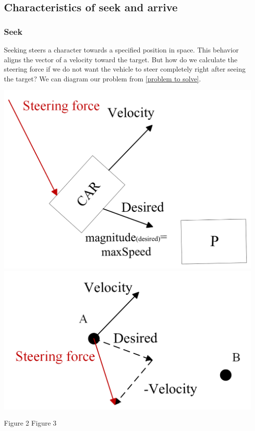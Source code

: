 \documentclass[10pt,twoside,english,a4paper]{article}
\begin{document}
\subsection{Characteristics of seek and arrive } \label{characterictics of seek and arrive}

\subsubsection{Seek} \label{seek}

Seeking steers a character towards a specified position in space. 
This behavior aligns the vector of a velocity toward the target. 
But how do we calculate the steering force if we do not want the 
vehicle to steer completely right after seeing the target? We can 
diagram our problem from \ref{problem to solve}.

\includegraphics[scale=0.22]{diagram_car.png} 	
\includegraphics[scale=0.22]{diagram_steeringForce.png}\par
\quad Figure 2 
\hspace*{\fill} Figure 3
\bigbreak
\end{document}
